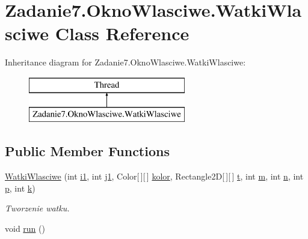 \hypertarget{class_zadanie7_1_1_okno_wlasciwe_1_1_watki_wlasciwe}{}\section{Zadanie7.\+Okno\+Wlasciwe.\+Watki\+Wlasciwe Class Reference}
\label{class_zadanie7_1_1_okno_wlasciwe_1_1_watki_wlasciwe}
Inheritance diagram for Zadanie7.\+Okno\+Wlasciwe.\+Watki\+Wlasciwe\+:\begin{figure}[H]
\begin{center}
\leavevmode
\includegraphics[height=2.000000cm]{class_zadanie7_1_1_okno_wlasciwe_1_1_watki_wlasciwe}
\end{center}
\end{figure}
\subsection*{Public Member Functions}
\begin{DoxyCompactItemize}
\item 
\hyperlink{class_zadanie7_1_1_okno_wlasciwe_1_1_watki_wlasciwe_a1115b2ad5f88ed9e0b3435a5bbc7d60a}{Watki\+Wlasciwe} (int \hyperlink{class_zadanie7_1_1_okno_wlasciwe_1_1_watki_wlasciwe_a28c612e4cd60226257222d9070a2e9f7}{i1}, int \hyperlink{class_zadanie7_1_1_okno_wlasciwe_1_1_watki_wlasciwe_a786ddbb34c817fbc00f1b46dc931f225}{j1}, Color\mbox{[}$\,$\mbox{]}\mbox{[}$\,$\mbox{]} \hyperlink{class_zadanie7_1_1_okno_wlasciwe_1_1_watki_wlasciwe_a49a3e6dd42f69b24a442855b7407e51e}{kolor}, Rectangle2D\mbox{[}$\,$\mbox{]}\mbox{[}$\,$\mbox{]} \hyperlink{class_zadanie7_1_1_okno_wlasciwe_1_1_watki_wlasciwe_ac3435b7920d2703e6dac78ec74ac36d6}{t}, int \hyperlink{class_zadanie7_1_1_okno_wlasciwe_1_1_watki_wlasciwe_a2e0f32af73eb52749d152f59e5278f45}{m}, int \hyperlink{class_zadanie7_1_1_okno_wlasciwe_1_1_watki_wlasciwe_a1e976e2b4da195c9013b64ed548cd0ca}{n}, int \hyperlink{class_zadanie7_1_1_okno_wlasciwe_1_1_watki_wlasciwe_a22e8786a26cf4b1898ae0d69f4bd01b9}{p}, int \hyperlink{class_zadanie7_1_1_okno_wlasciwe_1_1_watki_wlasciwe_a6a683092fcf7c93da165c5d0dc13ea01}{k})
\begin{DoxyCompactList}\small\item\em Tworzenie watku. \end{DoxyCompactList}\item 
void \hyperlink{class_zadanie7_1_1_okno_wlasciwe_1_1_watki_wlasciwe_af2c065d19491d613d38eea3727e9f8ca}{run} ()
\end{DoxyCompactItemize}
